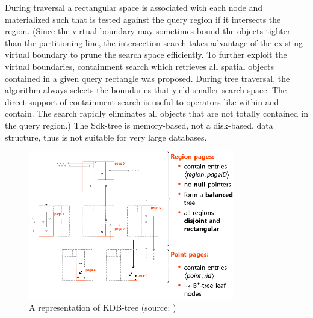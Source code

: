 \documentclass[a4paper,12pt]{article}
\begin{document}
\begin{itemize}
During traversal a rectangular space is associated with each node and materialized  such that is tested against the query region if it intersects the region. 
(Since the virtual boundary may sometimes bound the objects tighter than the partitioning line, the intersection search takes advantage of the existing virtual boundary to prune the search space efficiently. To further exploit the virtual boundaries, containment search which retrieves all spatial objects contained in a given query rectangle was proposed. During tree traversal, the algorithm always selects the boundaries that yield smaller search space. The direct support of containment search is useful to operators like within and contain. The search rapidly eliminates all objects that are not totally contained in the query region.)
The Sdk-tree is memory-based, not a disk-based, data structure, thus is not suitable for very large databases.

\end{itemize}


\begin{figure}
\centering
\includegraphics[width=0.8\textwidth]{kdbtree}
\caption{A representation of KDB-tree (source: \cite{kdbtree})}
\label{figkdbtree}
\end{figure}
 
\end{document}

